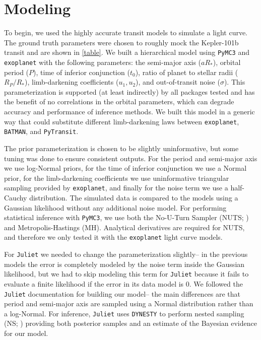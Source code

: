\documentclass[RNAAS]{aastex631}
\begin{document}
\section{Modeling}

To begin, we used the highly accurate \citet{2020AJ....159..123A} transit models to simulate a light curve. The ground truth parameters were chosen to roughly mock the Kepler-101b transit \citep{2014A&A...572A...2B} and are shown in \autoref{table}. We built a hierarchical model using \texttt{PyMC3} \citep{2016ascl.soft10016S} and \texttt{exoplanet} with the following parameters: the semi-major axis ($aR_*$), orbital period ($P$), time of inferior conjunction ($t_0$), ratio of planet to stellar radii ($R_P/R_*$), limb-darkening coefficients ($u_1,u_2$), and out-of-transit noise ($\sigma$). This parameterization is supported (at least indirectly) by all packages tested and has the benefit of no correlations in the orbital parameters, which can degrade accuracy and performance of inference methods. We built this model in a generic way that could substitute different limb-darkening laws between \texttt{exoplanet}, \texttt{BATMAN}, and \texttt{PyTransit}.

The prior parameterization is chosen to be slightly uninformative, but some tuning was done to ensure consistent outputs. For the period and semi-major axis we use log-Normal priors, for the time of inferior conjunction we use a Normal prior, for the limb-darkening coefficients we use uninformative triangular sampling \citep{2013MNRAS.435.2152K} provided by \texttt{exoplanet}, and finally for the noise term we use a half-Cauchy distribution. The simulated data is compared to the models using a Gaussian likelihood without any additional noise model. For performing statistical inference with \texttt{PyMC3}, we use both the No-U-Turn Sampler (NUTS; \citealp{2011arXiv1111.4246H}) and Metropolis-Hastings (MH). Analytical derivatives are required for NUTS, and therefore we only tested it with the \texttt{exoplanet} light curve models.

For \texttt{Juliet} we needed to change the parameterization slightly-- in the previous models the error is completely modeled by the noise term inside the Gaussian likelihood, but we had to skip modeling this term for \texttt{Juliet} because it fails to evaluate a finite likelihood if the error in its data model is 0. We followed the \texttt{Juliet} documentation for building our model-- the main differences are that period and semi-major axis are sampled using a Normal distribution rather than a log-Normal. For inference, \texttt{Juliet} uses \texttt{DYNESTY} \citep{2020MNRAS.493.3132S} to perform nested sampling (NS; \citealp{2004AIPC..735..395S}) providing both posterior samples and an estimate of the Bayesian evidence for our model.
\end{document}

